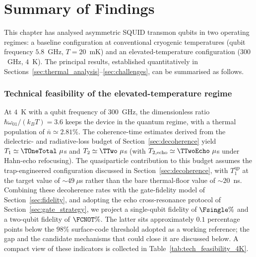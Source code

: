 \section{Summary of Findings}
\label{sec:summary_of_findings}

This chapter has analysed asymmetric SQUID transmon qubits in two operating regimes: a baseline configuration at conventional cryogenic temperatures (qubit frequency $5.8$~GHz, $T = 20$~mK) and an elevated-temperature configuration ($300$~GHz, $4$~K). The principal results, established quantitatively in Sections~\ref{sec:thermal_analysis}--\ref{sec:challenges}, can be summarised as follows.

\subsubsection*{Technical feasibility of the elevated-temperature regime}

At $4$~K with a qubit frequency of $300$~GHz, the dimensionless ratio $\hbar\omega_{01}/(k_B T) = 3.6$ keeps the device in the quantum regime, with a thermal population of $\bar{n} \simeq 2.81\%$. The coherence-time estimates derived from the dielectric- and radiative-loss budget of Section~\ref{sec:decoherence} yield $T_1 \simeq \TOneTotal~\mu$s and $T_2 \simeq \TTwo~\mu$s (with $T_{2,\text{echo}} \simeq \TTwoEcho~\mu$s under Hahn-echo refocusing). The quasiparticle contribution to this budget assumes the trap-engineered configuration discussed in Section~\ref{sec:decoherence}, with $T_1^{\text{qp}}$ at the target value of $\sim 49~\mu$s rather than the bare thermal-floor value of $\sim 20$~ns. Combining these decoherence rates with the gate-fidelity model of Section~\ref{sec:fidelity}, and adopting the echo cross-resonance protocol of Section~\ref{sec:gate_strategy}, we project a single-qubit fidelity of $\Fsingle\%$ and a two-qubit fidelity of $\FCNOT\%$. The latter sits approximately $0.1$ percentage points below the $98\%$ surface-code threshold adopted as a working reference; the gap and the candidate mechanisms that could close it are discussed below. A compact view of these indicators is collected in Table~\ref{tab:tech_feasibility_4K}.

